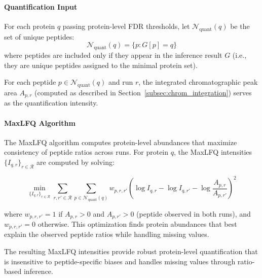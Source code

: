 \documentclass{article}
\begin{document}
\paragraph{Quantification Input} For each protein $q$ passing protein-level FDR thresholds, let $\mathcal{N}_{\text{quant}}(q)$ be the set of unique peptides:
\begin{equation}
\mathcal{N}_{\text{quant}}(q) = \{p : G[p] = q\}
\end{equation}
where peptides are included only if they appear in the inference result $G$ (i.e., they are unique peptides assigned to the minimal protein set).

For each peptide $p \in \mathcal{N}_{\text{quant}}(q)$ and run $r$, the integrated chromatographic peak area $A_{p,r}$ (computed as described in Section~\ref{subsec:chrom_integration}) serves as the quantification intensity.

\paragraph{MaxLFQ Algorithm} The MaxLFQ algorithm computes protein-level abundances that maximize consistency of peptide ratios across runs. For protein $q$, the MaxLFQ intensities $\{I_{q,r}\}_{r \in \mathcal{R}}$ are computed by solving:

\begin{equation}
\min_{\{I_{q,r}\}_{r \in \mathcal{R}}} \sum_{r,r' \in \mathcal{R}} \sum_{p \in \mathcal{N}_{\text{quant}}(q)} w_{p,r,r'} \left( \log I_{q,r} - \log I_{q,r'} - \log \frac{A_{p,r}}{A_{p,r'}} \right)^2
\end{equation}

where $w_{p,r,r'} = 1$ if $A_{p,r} > 0$ and $A_{p,r'} > 0$ (peptide observed in both runs), and $w_{p,r,r'} = 0$ otherwise. This optimization finds protein abundances that best explain the observed peptide ratios while handling missing values.

The resulting MaxLFQ intensities provide robust protein-level quantification that is insensitive to peptide-specific biases and handles missing values through ratio-based inference.
\end{document}
